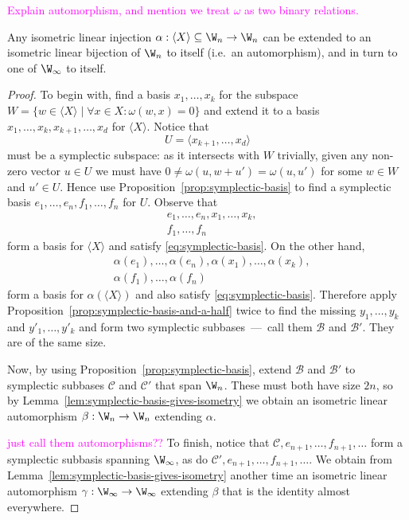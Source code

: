 \textcolor{magenta}{Explain automorphism, and mention we treat $\omega$ as two binary relations.}

\begin{proposition} \label{prop:symplectic-witt-extension}
    Any isometric linear injection $\alpha : \langle X \rangle \subseteq \W_n \to \W_n$ 
    can be extended to an isometric linear bijection of $\W_n$ to itself (i.e.~an automorphism),
    and in turn to one of $\W_\infty$ to itself.
\end{proposition}

\begin{proof}
    To begin with, find a basis $x_1, \ldots, x_k$ for the subspace $W = \{ w \in \langle X \rangle \mid \forall x \in X : \omega(w, x) = 0 \}$ 
    and extend it to a basis \(
        x_1, \ldots, x_k, x_{k+1}, \ldots, x_d
    \) for $\langle X \rangle$.
    Notice that
    \[
        U = \langle x_{k+1}, \ldots, x_d \rangle
    \] must be a symplectic subspace:
    as it intersects with $W$ trivially, 
    given any non-zero vector $u \in U$ we must have $0 \neq \omega(u, w + u') = \omega(u, u')$ for some $w \in W$ and $u' \in U$.
    Hence use Proposition~\ref{prop:symplectic-basis} to find a symplectic basis
    \(
        e_1, \ldots, e_n,
        f_1, \ldots, f_n
    \)
    for $U$.
    Observe that 
    \begin{align*}
        &e_1, \ldots, e_n, x_1, \ldots, x_k, \\
        &f_1, \ldots, f_n
    \end{align*}
    form a basis for $\langle X \rangle$ and satisfy \eqref{eq:symplectic-basis}.
    On the other hand,
    \begin{align*}
        &\alpha(e_1), \ldots, \alpha(e_n), \alpha(x_1), \ldots, \alpha(x_k), \\
        &\alpha(f_1), \ldots, \alpha(f_n)
    \end{align*}
    form a basis for $\alpha(\langle X \rangle)$ and also satisfy \eqref{eq:symplectic-basis}.
    Therefore apply Proposition~\ref{prop:symplectic-basis-and-a-half} twice to find the missing 
    $y_1, \ldots, y_k$ and $y'_1, \ldots, y'_k$ and form two symplectic subbases~---~call them $\mathcal{B}$ and $\mathcal{B}'$.
    They are of the same size.

    Now, by using Proposition~\ref{prop:symplectic-basis}, extend $\mathcal{B}$ and $\mathcal{B}'$ to symplectic subbases $\mathcal{C}$ and $\mathcal{C}'$ that span $\W_n$.
    These must both have size $2n$, 
    so by Lemma~\ref{lem:symplectic-basis-gives-isometry} we obtain an isometric linear automorphism $\beta : \W_n \to \W_n$ extending $\alpha$.

    \textcolor{magenta}{just call them automorphisms??}
    To finish, notice that $\mathcal{C}, e_{n+1}, \ldots, f_{n+1}, \ldots$ form a symplectic subbasis spanning $\W_\infty$, as do $\mathcal{C}', e_{n+1}, \ldots, f_{n+1}, \ldots$.
    We obtain from Lemma~\ref{lem:symplectic-basis-gives-isometry} another time an isometric linear automorphism $\gamma : \W_\infty \to \W_\infty$ extending $\beta$ 
    that is the identity almost everywhere.
\end{proof}


